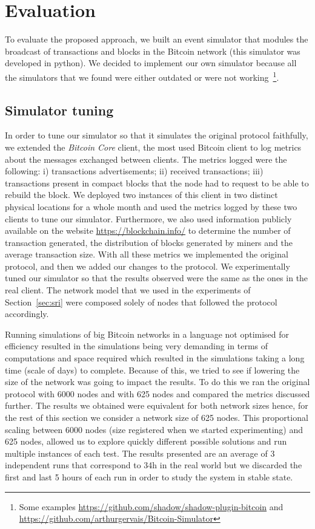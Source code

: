 \documentclass{dads}   %
\begin{document}
\section{Evaluation}
\label{sec:evaluation}
To evaluate the proposed approach, we built an event simulator that modules the broadcast of transactions and blocks in the Bitcoin network (this simulator was developed in python). We decided to implement our own simulator because all the simulators that we found were either outdated or were not working~\footnote{Some examples \url{https://github.com/shadow/shadow-plugin-bitcoin} and \url{https://github.com/arthurgervais/Bitcoin-Simulator}}. 

\subsection{Simulator tuning}
In order to tune our simulator so that it simulates the original protocol faithfully, we extended the \textsl{Bitcoin Core} client, the most used Bitcoin client to log metrics about the messages exchanged between clients. The metrics logged were the following: i) transactions advertisements; ii) received transactions; iii) transactions present in compact blocks that the node had to request to be able to rebuild the block. We deployed two instances of this client in two distinct physical locations for a whole month and used the metrics logged by these two clients to tune our simulator. Furthermore, we also used information publicly available on the website \url{https://blockchain.info/} to determine the number of transaction generated, the distribution of blocks generated by miners and the average transaction size. With all these metrics we implemented the original protocol, and then we added our changes to the protocol. We experimentally tuned our simulator so that the results observed were the same as the ones in the real client. The network model that we used in the experiments of Section~\ref{sec:sri} were composed solely of nodes that followed the protocol accordingly.

Running simulations of big Bitcoin networks in a language not optimised for efficiency resulted in the simulations being very demanding in terms of computations and space required which resulted in the simulations taking a long time (scale of days) to complete. Because of this, we tried to see if lowering the size of the network was going to impact the results. To do this we ran the original protocol with 6000 nodes and with 625 nodes and compared the metrics discussed further. The results we obtained were equivalent for both network sizes hence, for the rest of this section we consider a network size of 625 nodes. This proportional scaling between 6000 nodes (size registered when we started experimenting) and 625 nodes, allowed us to explore quickly different possible solutions and run multiple instances of each test. The results presented are an average of 3 independent runs that correspond to 34h in the real world but we discarded the first and last 5 hours of each run in order to study the system in stable state.
\end{document}
